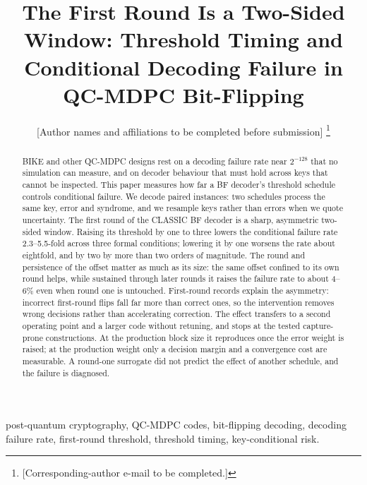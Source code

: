 \documentclass[lettersize,journal]{IEEEtran}
\begin{document}
\title{The First Round Is a Two-Sided Window: Threshold Timing and
Conditional Decoding Failure in QC-MDPC Bit-Flipping}

\author{[Author names and affiliations to be completed before submission]%
\thanks{[Corresponding-author e-mail to be completed.]}}

\maketitle

\begin{abstract}

BIKE and other QC-MDPC designs rest on a decoding failure rate near $2^{-128}$ that no simulation can measure, and on decoder behaviour that must hold across keys that cannot be inspected. This paper measures how far a BF decoder's threshold schedule controls conditional failure. We decode paired instances: two schedules process the same key, error and syndrome, and we resample keys rather than errors when we quote uncertainty. The first round of the CLASSIC BF decoder is a sharp, asymmetric two-sided window. Raising its threshold by one to three lowers the conditional failure rate 2.3--5.5-fold across three formal conditions; lowering it by one worsens the rate about eightfold, and by two by more than two orders of magnitude. The round and persistence of the offset matter as much as its size: the same offset confined to its own round helps, while sustained through later rounds it raises the failure rate to about 4--6\% even when round one is untouched. First-round records explain the asymmetry: incorrect first-round flips fall far more than correct ones, so the intervention removes wrong decisions rather than accelerating correction. The effect transfers to a second operating point and a larger code without retuning, and stops at the tested capture-prone constructions. At the production block size it reproduces once the error weight is raised; at the production weight only a decision margin and a convergence cost are measurable. A round-one surrogate did not predict the effect of another schedule, and the failure is diagnosed.

\end{abstract}

\begin{IEEEkeywords}
post-quantum cryptography, QC-MDPC codes, bit-flipping decoding, decoding
failure rate, first-round threshold, threshold timing, key-conditional risk.
\end{IEEEkeywords}
\end{document}
